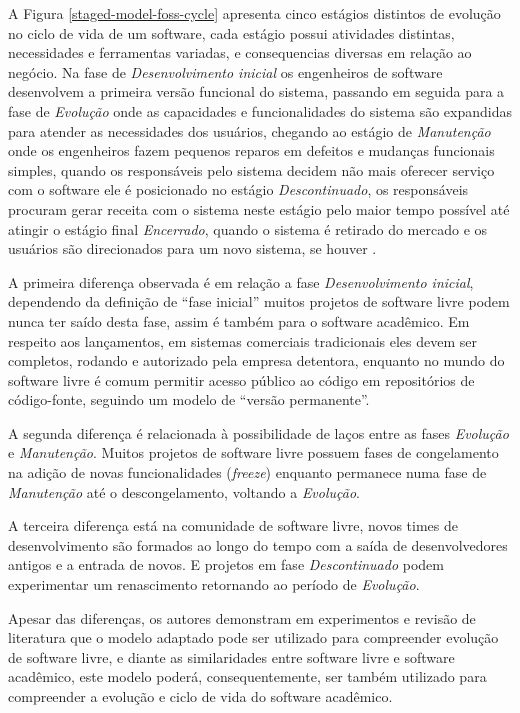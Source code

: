 A Figura \ref{staged-model-foss-cycle} apresenta cinco estágios distintos de
evolução no ciclo de vida de um software, cada estágio possui atividades
distintas, necessidades e ferramentas variadas, e consequencias diversas em
relação ao negócio. Na fase de {\it Desenvolvimento inicial} os engenheiros de
software desenvolvem a primeira versão funcional do sistema, passando em
seguida para a fase de {\it Evolução} onde as capacidades e funcionalidades do
sistema são expandidas para atender as necessidades dos usuários, chegando ao
estágio de {\it Manutenção} onde os engenheiros fazem pequenos reparos em
defeitos e mudanças funcionais simples, quando os responsáveis pelo sistema
decidem não mais oferecer serviço com o software ele é posicionado no estágio
{\it Descontinuado}, os responsáveis procuram gerar receita com o sistema neste
estágio pelo maior tempo possível até atingir o estágio final {\it Encerrado},
quando o sistema é retirado do mercado e os usuários são direcionados para um
novo sistema, se houver \cite{rajlich2000staged}.

A primeira diferença observada é em relação a fase {\it Desenvolvimento inicial},
dependendo da definição de ``fase inicial'' muitos projetos de software livre
podem nunca ter saído desta fase, assim é também para o software acadêmico. Em respeito aos lançamentos,
em sistemas comerciais tradicionais eles devem ser completos, rodando e autorizado
pela empresa detentora, enquanto no mundo do software livre é comum
permitir acesso público ao código em repositórios de código-fonte, seguindo
um modelo de ``versão permanente''.

A segunda diferença é relacionada à possibilidade de laços entre
as fases {\it Evolução} e {\it Manutenção}. Muitos projetos de software livre
possuem fases de congelamento na adição de novas funcionalidades ({\it freeze})
enquanto permanece numa fase de {\it Manutenção} até o descongelamento, voltando
a {\it Evolução}.

A terceira diferença está na comunidade de software livre,
novos times de desenvolvimento são formados ao longo do tempo
com a saída de desenvolvedores antigos e a entrada de novos.
E projetos em fase {\it Descontinuado} podem experimentar um renascimento
retornando ao período de {\it Evolução}.

Apesar das diferenças, os autores  demonstram em experimentos e
revisão de literatura que o modelo adaptado pode ser utilizado para
compreender evolução de software livre, e diante as similaridades entre software livre
e software acadêmico, este modelo poderá, consequentemente, ser também
utilizado para compreender a evolução e ciclo de vida do software acadêmico.
